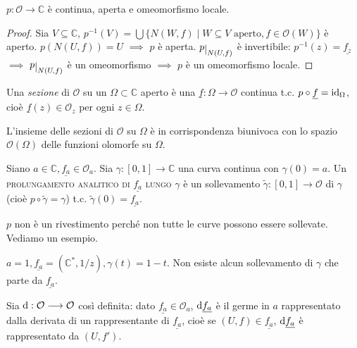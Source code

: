 \begin{prop}
  $p: \mathcal{O} \longrightarrow \mathbb{C}$ è continua, aperta e omeomorfismo locale.
\end{prop}

\begin{proof}
  Sia $V \subseteq \mathbb{C}$, $\displaystyle p^{-1}(V)=\bigcup\{N(W, f) \mid W \subseteq V \text{ aperto}, f \in \mathcal{O}(W)\}$ è aperto. $p(N(U, f))=U$ $\implies$ $p$ è aperta.
  $p\restrict{N(U, f)}$ è invertibile: $p^{-1}(z)=\underline{f_z}$ $\implies$ $p\restrict{N(U, f)}$ è un omeomorfismo $\implies$ $p$ è un omeomorfismo locale.
\end{proof}

\begin{defn}
  Una \textit{sezione} di $\mathcal{O}$ su un $\Omega \subset \mathbb{C}$ aperto è una $\underline{f}:\Omega \longrightarrow \mathcal{O}$ continua t.c. $p \circ \underline{f}=\operatorname{id}_{\Omega}$, cioè $\underline{f}(z) \in \mathcal{O}_z$ per ogni $z \in \Omega$.
\end{defn}

\begin{exc}
  L'insieme delle sezioni di $\mathcal{O}$ su $\Omega$ è in corrispondenza biunivoca con lo spazio $\mathcal{O}(\Omega)$ delle funzioni olomorfe su $\Omega$.
\end{exc}

\begin{defn}
  Siano $a \in \mathbb{C}, \underline{f_a} \in \mathcal{O}_a$. Sia $\gamma:[0, 1] \longrightarrow \mathbb{C}$ una curva continua con $\gamma(0)=a$.
  Un \textsc{prolungamento analitico di $\underline{f_a}$ lungo $\gamma$} è un sollevamento $\tilde{\gamma}:[0, 1] \longrightarrow \mathcal{O}$ di $\gamma$ (cioè $p \circ \tilde{\gamma}=\gamma$) t.c. $\tilde{\gamma}(0)=\underline{f_a}$.
\end{defn}

\begin{oss}
  $p$ non è un rivestimento perché non tutte le curve possono essere sollevate. Vediamo un esempio.
\end{oss}

\begin{ex}
  $a=1, \underline{f_a}=(\mathbb{C}^*, 1/z), \gamma(t)=1-t$. Non esiste alcun sollevamento di $\gamma$ che parte da $\underline{f_a}$.
\end{ex}

\begin{defn}
  Sia $\mathop{}\!\mathrm{d}:\mathcal{O} \longrightarrow \mathcal{O}$ così definita: dato $\underline{f_a} \in \mathcal{O}_a$, $\mathop{}\!\mathrm{d}\underline{f_a}$ è il germe in $a$ rappresentato dalla derivata di un rappresentante di $\underline{f_a}$, cioè se $(U, f) \in \underline{f_a}$, $\mathop{}\!\mathrm{d}\underline{f_a}$ è rappresentato da $(U, f')$.
\end{defn}

